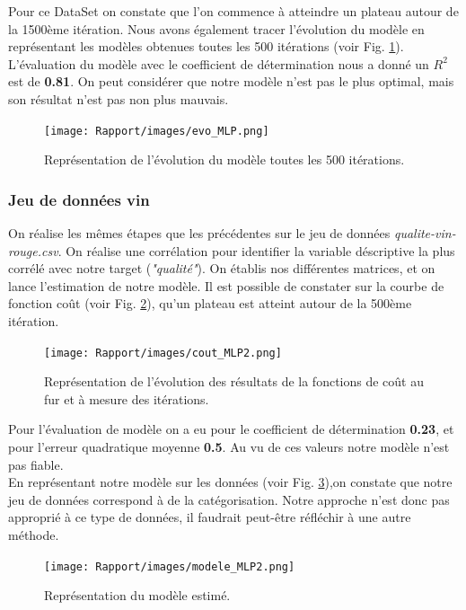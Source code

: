 \documentclass[french]{article}
\begin{document}
Pour ce DataSet on constate que l'on commence à atteindre un plateau autour de la 1500ème itération. Nous avons également tracer l'évolution du modèle en représentant les modèles obtenues toutes les 500 itérations (voir Fig. \ref{fig:evo_MLP}). L'évaluation du modèle avec le coefficient de détermination nous a donné un $R^{2}$ est de \textbf{0.81}. On peut considérer que notre modèle n'est pas le plus optimal, mais son résultat n'est pas non plus mauvais.

\begin{figure}[!htbp]
    \centering
    \texttt{[image: Rapport/images/evo\_MLP.png]}
    \caption{Représentation de l'évolution du modèle toutes les 500 itérations.}
    \label{fig:evo_MLP}
\end{figure}

\subsubsection{Jeu de données vin}

On réalise les mêmes étapes que les précédentes sur le jeu de données \textit{qualite-vin-rouge.csv}. On réalise une corrélation pour identifier la variable déscriptive la plus corrélé avec notre target (\textit{"qualité"}). On établis nos différentes matrices, et on lance l'estimation de notre modèle. Il est possible de constater sur la courbe de fonction coût (voir Fig. \ref{fig:cout_MLP2}), qu'un plateau est atteint autour de la 500ème itération.\\

\begin{figure}[!htbp]
    \centering
    \texttt{[image: Rapport/images/cout\_MLP2.png]}
    \caption{Représentation de l'évolution des résultats de la fonctions de coût au fur et à mesure des itérations.}
    \label{fig:cout_MLP2}
\end{figure}

\noindent Pour l'évaluation de modèle on a eu pour le coefficient de détermination \textbf{0.23}, et pour l'erreur quadratique moyenne \textbf{0.5}. Au vu de ces valeurs notre modèle n'est pas fiable.\\

\noindent En représentant notre modèle sur les données (voir Fig. \ref{fig:modele_mlp2}),on constate que notre jeu de données correspond à de la catégorisation. Notre approche n'est donc pas approprié à ce type de données, il faudrait peut-être réfléchir à une autre méthode.

\begin{figure}[!htbp]
    \centering
    \texttt{[image: Rapport/images/modele\_MLP2.png]}
    \caption{Représentation du modèle estimé.}
    \label{fig:modele_mlp2}
\end{figure}
\end{document}
